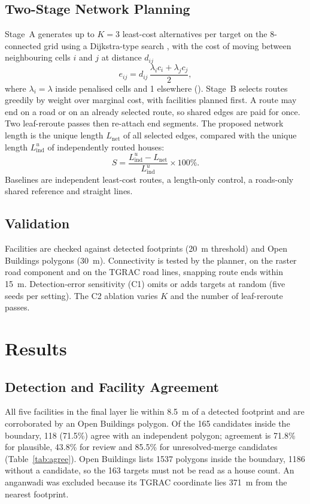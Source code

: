 \subsection{Two-Stage Network Planning}
Stage~A generates up to $K=3$ least-cost alternatives per target on the 8-connected grid using a Dijkstra-type search \cite{dijkstra1959}, with the cost of moving between neighbouring cells $i$ and $j$ at distance $d_{ij}$
\begin{equation}
e_{ij} = d_{ij}\,\frac{\lambda_i c_i + \lambda_j c_j}{2},
\label{eq:edge}
\end{equation}
where $\lambda_i=\lambda$ inside penalised cells and 1 elsewhere (). Stage~B selects routes greedily by weight over marginal cost, with facilities planned first. A route may end on a road or on an already selected route, so shared edges are paid for once. Two leaf-reroute passes then re-attach end segments. The proposed network length is the unique length $L_{\mathrm{net}}$ of all selected edges, compared with the unique length $L_{\mathrm{ind}}^{u}$ of independently routed houses:
\begin{equation}
S = \frac{L_{\mathrm{ind}}^{u} - L_{\mathrm{net}}}{L_{\mathrm{ind}}^{u}} \times 100\%.
\label{eq:saving}
\end{equation}
Baselines are independent least-cost routes, a length-only control, a roads-only shared reference and straight lines.

\subsection{Validation}
Facilities are checked against detected footprints (20~m threshold) and Open Buildings polygons (30~m). Connectivity is tested by the planner, on the raster road component and on the TGRAC road lines, snapping route ends within 15~m. Detection-error sensitivity (C1) omits or adds targets at random (five seeds per setting). The C2 ablation varies $K$ and the number of leaf-reroute passes.

\section{Results}
\subsection{Detection and Facility Agreement}
All five facilities in the final layer lie within 8.5~m of a detected footprint and are corroborated by an Open Buildings polygon. Of the 165 candidates inside the boundary, 118 (71.5\%) agree with an independent polygon; agreement is 71.8\% for plausible, 43.8\% for review and 85.5\% for unresolved-merge candidates (Table~\ref{tab:agree}). Open Buildings lists 1537 polygons inside the boundary, 1186 without a candidate, so the 163 targets must not be read as a house count. An anganwadi was excluded because its TGRAC coordinate lies 371~m from the nearest footprint.

